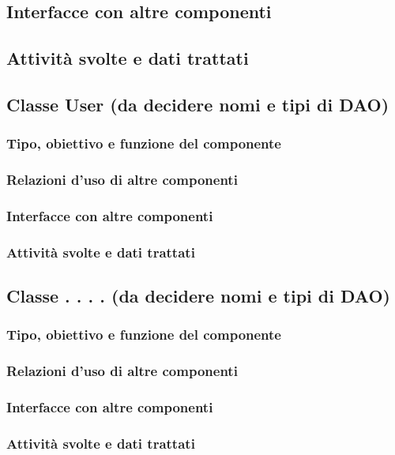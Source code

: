 \subsection*{Interfacce con altre componenti}
\subsection*{Attivit\`a svolte e dati trattati}

\subsection{Classe User (da decidere nomi e tipi di DAO)}
\subsubsection*{Tipo, obiettivo e funzione del componente}
\subsubsection*{Relazioni d'uso di altre componenti}
\subsubsection*{Interfacce con altre componenti}
\subsubsection*{Attivit\`a svolte e dati trattati}

\subsection{Classe . . . . (da decidere nomi e tipi di DAO)}
\subsubsection*{Tipo, obiettivo e funzione del componente}
\subsubsection*{Relazioni d'uso di altre componenti}
\subsubsection*{Interfacce con altre componenti}
\subsubsection*{Attivit\`a svolte e dati trattati}

